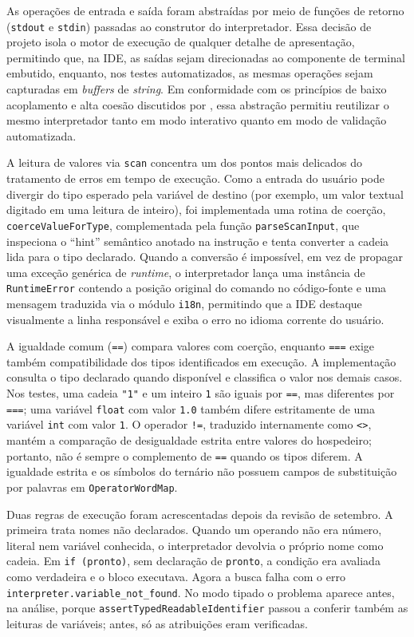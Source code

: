 As operações de entrada e saída foram abstraídas por meio de funções de retorno (\texttt{stdout} e \texttt{stdin}) passadas ao construtor do interpretador. Essa decisão de projeto isola o motor de execução de qualquer detalhe de apresentação, permitindo que, na IDE, as saídas sejam direcionadas ao componente de terminal embutido, enquanto, nos testes automatizados, as mesmas operações sejam capturadas em \textit{buffers} de \textit{string}. Em conformidade com os princípios de baixo acoplamento e alta coesão discutidos por , essa abstração permitiu reutilizar o mesmo interpretador tanto em modo interativo quanto em modo de validação automatizada.

A leitura de valores via \texttt{scan} concentra um dos pontos mais delicados do tratamento de erros em tempo de execução. Como a entrada do usuário pode divergir do tipo esperado pela variável de destino (por exemplo, um valor textual digitado em uma leitura de inteiro), foi implementada uma rotina de coerção, \texttt{coerceValue}\allowbreak\texttt{ForType}, complementada pela função \texttt{parseScanInput}, que inspeciona o ``hint'' semântico anotado na instrução e tenta converter a cadeia lida para o tipo declarado. Quando a conversão é impossível, em vez de propagar uma exceção genérica de \textit{runtime}, o interpretador lança uma instância de \texttt{RuntimeError} contendo a posição original do comando no código-fonte e uma mensagem traduzida via o módulo \texttt{i18n}, permitindo que a IDE destaque visualmente a linha responsável e exiba o erro no idioma corrente do usuário.

A igualdade comum (\texttt{==}) compara valores com coerção, enquanto \texttt{===} exige também compatibilidade dos tipos identificados em execução. A implementação consulta o tipo declarado quando disponível e classifica o valor nos demais casos. Nos testes, uma cadeia \texttt{"1"} e um inteiro \texttt{1} são iguais por \texttt{==}, mas diferentes por \texttt{===}; uma variável \texttt{float} com valor \texttt{1.0} também difere estritamente de uma variável \texttt{int} com valor \texttt{1}. O operador \texttt{!=}, traduzido internamente como \texttt{<>}, mantém a comparação de desigualdade estrita entre valores do hospedeiro; portanto, não é sempre o complemento de \texttt{==} quando os tipos diferem. A igualdade estrita e os símbolos do ternário não possuem campos de substituição por palavras em \texttt{OperatorWordMap}.

Duas regras de execução foram acrescentadas depois da revisão de setembro. A primeira trata nomes não declarados. Quando um operando não era número, literal nem variável conhecida, o interpretador devolvia o próprio nome como cadeia. Em \texttt{if (pronto)}, sem declaração de \texttt{pronto}, a condição era avaliada como verdadeira e o bloco executava. Agora a busca falha com o erro \texttt{interpreter.\allowbreak{}variable\_\allowbreak{}not\_\allowbreak{}found}. No modo tipado o problema aparece antes, na análise, porque \texttt{assertTypedReadableIdentifier} passou a conferir também as leituras de variáveis; antes, só as atribuições eram verificadas.

